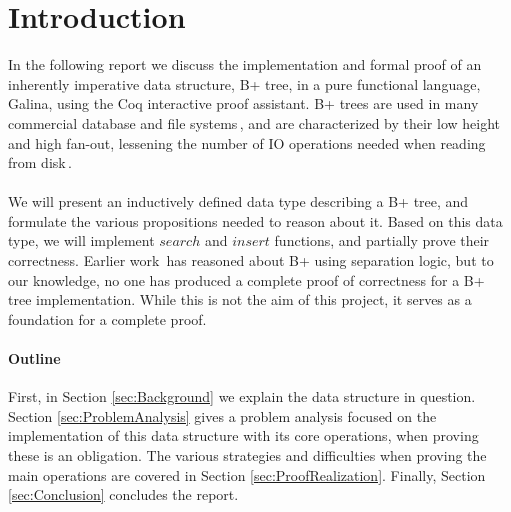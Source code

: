 \section{Introduction}
\label{sec:Introduction}
In the following report we discuss the implementation and formal proof of an inherently imperative data structure, B+ tree, in a pure functional language, Galina, using the Coq interactive proof assistant. B+ trees are used in many commercial database and file systems\,\cite[p. 359]{ramakrishnan2003database}, and are characterized by their low height and high fan-out, lessening the number of IO operations needed when reading from disk\,\cite[pp. 344]{ramakrishnan2003database}.
\paragraph{}
We will present an inductively defined data type describing a B+ tree, and formulate the various propositions needed to reason about it. Based on this data type, we will implement $search$ and $insert$ functions, and partially prove their correctness. Earlier work\,\cite{sexton2008reasoning} has reasoned about B+ using separation logic, but to our knowledge, no one has produced a complete proof of correctness for a B+ tree implementation. While this is not the aim of this project, it serves as a foundation for a complete proof.
\paragraph{Outline}
First, in Section \ref{sec:Background} we explain the data structure in question. Section \ref{sec:ProblemAnalysis} gives a problem analysis focused on the implementation of this data structure with its core operations, when proving these is an obligation. The various strategies and difficulties when proving the main operations are covered in Section \ref{sec:ProofRealization}. Finally, Section \ref{sec:Conclusion} concludes the report.